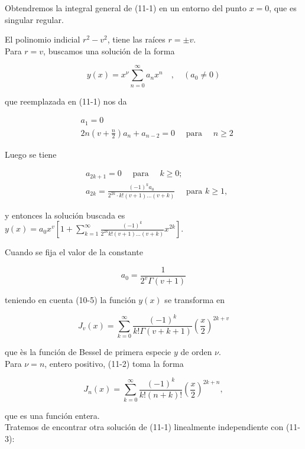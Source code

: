 \documentclass[10pt]{article}
\theoremstyle{plain}
\theoremstyle{definition}
\theoremstyle{remark}
\begin{document}
Obtendremos la integral general de (11-1) en un entorno del punto $x=0$, que es singular regular.

El polinomio indicial $r^{2}-v^{2}$, tiene las raíces $r= \pm v$.\\
Para $r=v$, buscamos una solución de la forma

$$
y(x)=x^{\nu} \sum_{n=0}^{\infty} a_{n} x^{n} \quad, \quad\left(a_{0} \neq 0\right)
$$

que reemplazada en (11-1) nos da


\begin{align*}
& a_{1}=0 \\
& 2 n\left(v+\frac{n}{2}\right) a_{n}+a_{n-2}=0 \quad \text { para } \quad n \geqslant 2 \tag{11-2}
\end{align*}


Luego se tiene

$$
\begin{aligned}
& a_{2 k+1}=0 \quad \text { para } \quad k \geqslant 0 ; \\
& a_{2 k}=\frac{(-1)^{k} a_{0}}{2^{2 k} \cdot k!(v+1) \ldots(v+k)} \quad \text { para } k \geqslant 1,
\end{aligned}
$$

y entonces la solución buscada es\\
$y(x)=a_{0} x^{v}\left[1+\sum_{k=1}^{\infty} \frac{(-1)^{k}}{2^{2 k} k!(v+1) \ldots(v+k)} x^{2 k}\right]$.

Cuando se fija el valor de la constante

$$
a_{0}=\frac{1}{2^{v} \Gamma(v+1)}
$$

teniendo en cuenta (10-5) la función $y(x)$ se transforma en


\begin{equation*}
J_{v}(x)=\sum_{k=0}^{\infty} \frac{(-1)^{k}}{k!\Gamma(v+k+1)}\left(\frac{x}{2}\right)^{2 k+v} \tag{11-3}
\end{equation*}


que ès la función de Bessel de primera especie $y$ de orden $\nu$.\\
Para $\nu=n$, entero positivo, (11-2) toma la forma


\begin{equation*}
J_{n}(x)=\sum_{k=0}^{\infty} \frac{(-1)^{k}}{k!(n+k)!}\left(\frac{x}{2}\right)^{2 k+n}, \tag{11-3’}
\end{equation*}


que es una función entera.\\
Tratemos de encontrar otra solución de (11-1) linealmente independiente con (11-3):
\end{document}
